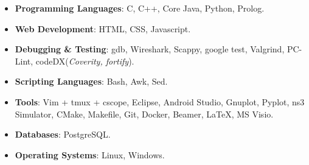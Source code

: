 \begin{multicols}{2}
\begin{itemize}
  \item \textbf{Programming Languages}: C, C++, Core Java, Python, Prolog.\\[-0.6cm]
  \item \textbf{Web Development}: HTML, CSS, Javascript.\\[-0.6cm]
  \item \textbf{Debugging \& Testing}: gdb, Wireshark, Scappy, google test, Valgrind, PC-Lint, codeDX(\textit{Coverity, fortify}).
\end{itemize}
\columnbreak
\begin{itemize}
 \item \textbf{Scripting Languages}: Bash, Awk, Sed.\\[-0.6cm]
  \item \textbf{Tools}: Vim + tmux + cscope, Eclipse, Android Studio, Gnuplot, Pyplot, ns3 Simulator, CMake, Makefile, Git, Docker, Beamer, \LaTeX, MS Visio.\\[-0.6cm]
    \item \textbf{Databases}: PostgreSQL. \\[-0.6cm]
  \item \textbf{Operating Systems}: Linux, Windows.\\[-0.6cm]
\end{itemize}
\end{multicols}

